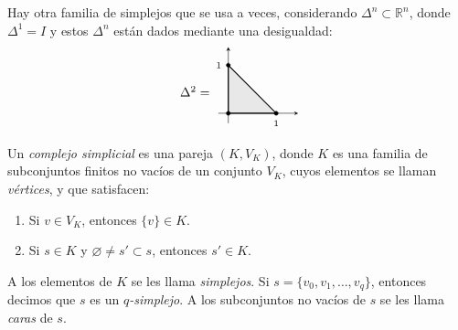 \begin{nota}
Hay otra familia de simplejos que se usa a veces, considerando $\Delta^n \subset \mathbb{R}^n$, donde $\Delta^1 = I$ y estos $\Delta^n$ están dados mediante una desigualdad:
\[
\begin{tikzpicture}[baseline=0.45cm, scale=1.1, >=stealth]
    \node[left] at (-0.35, 0.55) {$\Delta^2 =$};
    \fill[gray!18] (0,0) -- (1.2,0) -- (0,1.2) -- cycle;
    \draw[->, thin] (-0.25, 0) -- (1.75, 0);
    \draw[->, thin] (0, -0.25) -- (0, 1.65);
    \draw[thick] (0,0) -- (1.2,0) -- (0,1.2) -- cycle;
    \filldraw (0,0) circle (1.4pt);
    \filldraw (1.2,0) circle (1.4pt) node[below=2pt] {$\scriptstyle 1$};
    \filldraw (0,1.2) circle (1.4pt) node[left=2pt] {$\scriptstyle 1$};
\end{tikzpicture}
\]
\end{nota}

\begin{definicion}
Un \textit{complejo simplicial} es una pareja $(K, V_K)$, donde $K$ es una familia de subconjuntos finitos no vacíos de un conjunto $V_K$, cuyos elementos se llaman \textit{vértices}, y que satisfacen:
\begin{enumerate}
    \item Si $v \in V_K$, entonces $\{v\} \in K$.
    \item Si $s \in K$ y $\varnothing \neq s' \subset s$, entonces $s' \in K$.
\end{enumerate}
A los elementos de $K$ se les llama \textit{simplejos}. Si $s = \{v_0, v_1, \dots, v_q\}$, entonces decimos que $s$ es un \textit{$q$-simplejo}. A los subconjuntos no vacíos de $s$ se les llama \textit{caras} de $s$.
\end{definicion}

